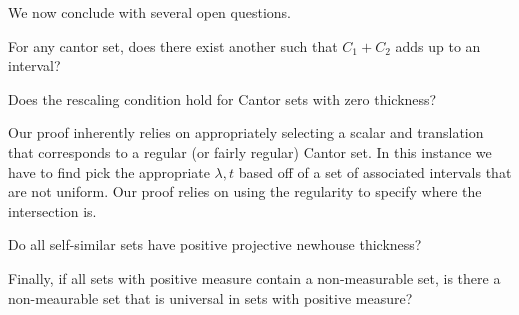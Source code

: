 We now conclude with several open questions.
\begin{conjecture}
    For any cantor set, does there exist another such that $C_1 + C_2$ adds up to an interval?
\end{conjecture}


Does the rescaling condition hold for Cantor sets with zero thickness?

Our proof inherently relies on appropriately selecting a scalar and translation that corresponds to a regular (or fairly regular) Cantor set.  In this instance we have to find pick the appropriate $\lambda, t$ based off of a set of associated intervals that are not uniform.  Our proof relies on using the regularity to specify where the intersection is. 

Do all self-similar sets have positive projective newhouse thickness?

Finally, if all sets with positive measure contain a non-measurable set, is there a non-meaurable set that is universal in sets with positive measure?


%



